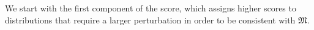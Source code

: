 \documentclass{article}
\theoremstyle{plain}
\theoremstyle{definition}
\theoremstyle{remark}
\newcommand\mat[1]{\mathbf{#1}}
\newcommand{\dg}[1]{\mathfrak{#1}}
\numberwithin{equation}{section}
\begin{document}
	We start with the first component of the score,
which assigns higher scores       
to distributions that require a larger perturbation in
        order to be consistent with $\dg M$.  
%
\end{document}
